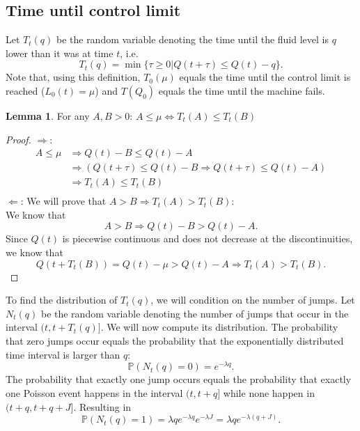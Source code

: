 \documentclass[a4paper]{thesis}
\theoremstyle{definition}
\newtheorem{lemma}{Lemma}
\begin{document}
\subsection{Time until control limit}
Let $T_t(q)$ be the random variable denoting the time until the fluid level is $q$ lower than it was at time $t$, i.e.
$$
T_t(q)=\min\{\tau\geq0|Q(t+\tau)\leq Q(t)-q\}.
$$
Note that, using this definition, $T_0(\mu)$ equals the time until the control limit is reached ($L_0(t)=\mu$) and $T(Q_0)$ equals the time until the machine fails.
\begin{lemma}\label{lemma:TimeUntilFluidLemma}
	For any $A,B>0$:
	$A\leq\mu\Leftrightarrow T_t(A)\leq T_t(B)$
	\begin{proof}
		$\Rightarrow$: 
		\[\begin{split}
		A\leq\mu&\Rightarrow Q(t)-B\leq Q(t)-A\\
		&\Rightarrow (Q(t+\tau)\leq Q(t)-B\Rightarrow Q(t+\tau)\leq Q(t)-A)\\
		&\Rightarrow T_t(A)\leq T_t(B)\\
		\end{split}\]
		$\Leftarrow$: We will prove that $A>B\Rightarrow T_t(A)> T_t(B)$:\\
		We know that
		$$
		A>B\Rightarrow Q(t)-B > Q(t)-A.
		$$
		Since $Q(t)$ is piecewise continuous and does not decrease at the discontinuities, we know that 
		$$
		Q(t+T_t(B))=Q(t)-\mu>Q(t)-A\Rightarrow T_t(A)> T_t(B).
		$$
	\end{proof}
\end{lemma}
To find the distribution of $T_t(q)$, we will condition on the number of jumps.
Let $N_t(q)$ be the random variable denoting the number of jumps that occur in the interval $(t,t+T_t(q)]$.
We will now compute its distribution.
The probability that zero jumps occur equals the probability that the exponentially distributed time interval is larger than $q$:
$$
\mathbb{P}(N_t(q)=0)=e^{-\lambda q}.
$$
The probability that exactly one jump occurs equals the probability that exactly one Poisson event happens in the interval $(t,t+q]$ while none happen in $(t+q,t+q+J]$. Resulting in
$$
\mathbb{P}(N_t(q)=1)=\lambda q e^{-\lambda q} e^{-\lambda J}=\lambda q e^{-\lambda (q+J)}.
$$
\end{document}
